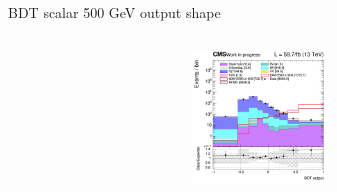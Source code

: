 \documentclass[8pt]{beamer}
\begin{document}
\begin{frame}{BDT scalar 500 GeV output shape}
\begin{columns}
\begin{column}{0.33\textwidth}
\begin{center}
			\begin{block}{}\end{block}	
     			\includegraphics[width=1.0\textwidth, height=100pt]{figs/2018/SmearSR-ttDM-scalar500/log_cratio_ST_topCR_ll_BDT_ttDM500_ST_BDT_output_scalar500_customBinsAttempt7.png}
    		\end{center}		
		\end{column}
\end{columns}


\end{frame}
\end{document}
